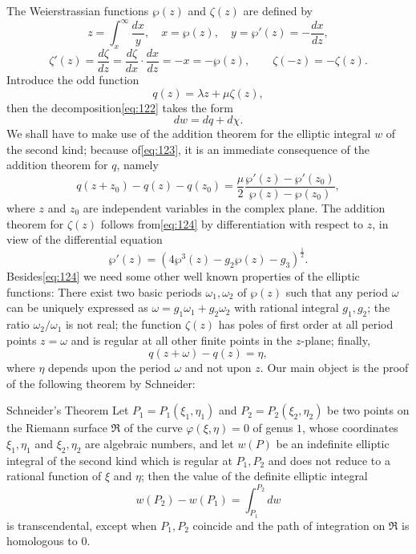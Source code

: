 The Weierstrassian functions $\wp(z)$ and $\zeta(z)$ are defined by
\[
z = \int_{x}^{\infty} \frac{dx}{y}, \quad x = \wp(z), \quad y = \wp'(z) = -\frac{dx}{dz},
\]
\[
\zeta'(z) = \frac{d\zeta}{dz} = \frac{d\zeta}{dx} \cdot \frac{dx}{dz} = -x = -\wp(z), \qquad \zeta(-z) = -\zeta(z).
\]
Introduce the odd function
\[
q(z) = \lambda z + \mu \zeta(z),
\]
then the decomposition\eqref{eq:122} takes the form
\begin{equation}
dw = dq + d\chi. \tag{123}\label{eq:123}
\end{equation}
We shall have to make use of the addition theorem for the elliptic integral $w$ of the second kind; because of\eqref{eq:123}, it is an immediate consequence of the addition theorem for $q$, namely
\begin{equation}
q(z+z_0) - q(z) - q(z_0) = \frac{\mu}{2} \frac{\wp'(z) - \wp'(z_0)}{\wp(z) - \wp(z_0)}, \tag{124}\label{eq:124}
\end{equation}
where $z$ and $z_0$ are independent variables in the complex plane. The addition theorem for $\zeta(z)$ follows from\eqref{eq:124} by differentiation with respect to $z$, in view of the differential equation
\[
\wp'(z) = \left(4 \wp^3(z) - g_2 \wp(z) - g_3\right)^{\frac{1}{2}}.
\]
Besides\eqref{eq:124} we need some other well known properties of the elliptic functions: There exist two basic periods $\omega_1, \omega_2$ of $\wp(z)$ such that any period $\omega$ can be uniquely expressed as $\omega = g_1 \omega_1 + g_2 \omega_2$ with rational integral $g_1, g_2$; the ratio $\omega_2 / \omega_1$ is not real; the function $\zeta(z)$ has poles of first order at all period points $z = \omega$ and is regular at all other finite points in the $z$-plane; finally,
\begin{equation}
q(z+\omega) - q(z) = \eta, \tag{125}\label{eq:125}
\end{equation}
where $\eta$ depends upon the period $\omega$ and not upon $z$. Our main object is the proof of the following theorem by Schneider:

\begin{mythm*}{Schneider's Theorem}
Let $P_1 = P_1(\xi_1, \eta_1)$ and $P_2 = P_2(\xi_2, \eta_2)$ be two points on the Riemann surface $\mathfrak{R}$ of the curve $\varphi(\xi, \eta) = 0$ of genus $1$, whose coordinates $\xi_1, \eta_1$ and $\xi_2, \eta_2$ are algebraic numbers, and let $w(P)$ be an indefinite elliptic integral of the second kind which is regular at $P_1, P_2$ and does not reduce to a rational function of $\xi$ and $\eta$; then the value of the definite elliptic integral
\begin{equation}
w(P_2) - w(P_1) = \int_{P_1}^{P_2} dw \tag{126}\label{eq:126}
\end{equation}
is transcendental, except when $P_1, P_2$ coincide and the path of integration on $\mathfrak{R}$ is homologous to $0$.
\end{mythm*}

